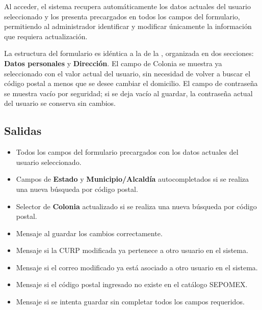Al acceder, el sistema recupera automáticamente los datos actuales 
del usuario seleccionado y los presenta precargados en todos los 
campos del formulario, permitiendo al administrador identificar 
y modificar únicamente la información que requiera actualización. 

La estructura del formulario es idéntica a la de la 
, organizada en dos 
secciones: \textbf{Datos personales} y \textbf{Dirección}. El campo 
de Colonia se muestra ya seleccionado con el valor actual del usuario, 
sin necesidad de volver a buscar el código postal a menos que se 
desee cambiar el domicilio. El campo de contraseña se muestra vacío 
por seguridad; si se deja vacío al guardar, la contraseña actual 
del usuario se conserva sin cambios.


\subsection{Salidas}
\begin{itemize}
	\item Todos los campos del formulario precargados con los datos 
	actuales del usuario seleccionado.
	\item Campos de \textbf{Estado} y \textbf{Municipio/Alcaldía} 
	autocompletados si se realiza una nueva búsqueda por código postal.
	\item Selector de \textbf{Colonia} actualizado si se realiza 
	una nueva búsqueda por código postal.
	\item Mensaje  al guardar 
	los cambios correctamente.
	\item Mensaje  si la CURP 
	modificada ya pertenece a otro usuario en el sistema.
	\item Mensaje  si el correo 
	modificado ya está asociado a otro usuario en el sistema.
	\item Mensaje  si el 
	código postal ingresado no existe en el catálogo SEPOMEX.
	\item Mensaje  si 
	se intenta guardar sin completar todos los campos requeridos.
\end{itemize}

